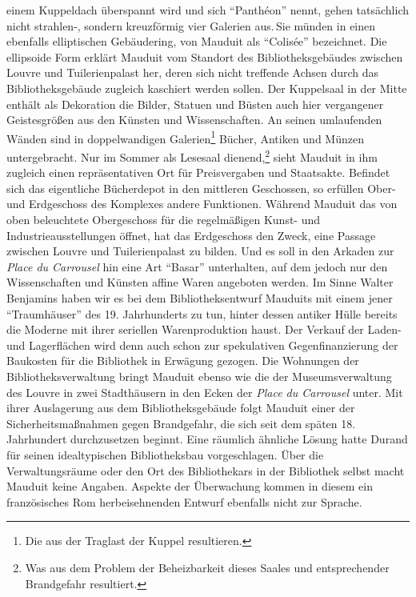 einem Kuppeldach überspannt wird und sich \enquote{Panthéon} nennt,
gehen tatsächlich nicht strahlen-, sondern kreuzförmig vier Galerien
aus.\,Sie münden in einen ebenfalls elliptischen Gebäudering, von Mauduit
als \enquote{Colisée} bezeichnet. Die ellipsoide Form erklärt Mauduit
vom Standort des Bibliotheksgebäudes zwischen Louvre und Tuilerienpalast
her, deren sich nicht treffende Achsen durch das Bibliotheksgebäude
zugleich kaschiert werden sollen. Der Kuppelsaal in der Mitte enthält
als Dekoration die Bilder, Statuen und Büsten auch hier vergangener
Geistesgrößen aus den Künsten und Wissenschaften. An seinen umlaufenden
Wänden sind in doppelwandigen Galerien\footnote{Die aus der Traglast der
  Kuppel resultieren.} Bücher, Antiken und Münzen untergebracht. Nur im
Sommer als Lesesaal dienend,\footnote{Was aus dem Problem der
  Beheizbarkeit dieses Saales und entsprechender Brandgefahr resultiert.}
sieht Mauduit in ihm zugleich einen repräsentativen Ort für
Preisvergaben und Staatsakte. Befindet sich das eigentliche Bücherdepot
in den mittleren Geschossen, so erfüllen Ober- und Erdgeschoss des
Komplexes andere Funktionen. Während Mauduit das von oben beleuchtete
Obergeschoss für die regelmäßigen Kunst- und Industrieausstellungen
öffnet, hat das Erdgeschoss den Zweck, eine Passage zwischen Louvre und
Tuilerienpalast zu bilden. Und es soll in den Arkaden zur \emph{Place du
Carrousel} hin eine Art \enquote{Basar} unterhalten, auf dem jedoch nur
den Wissenschaften und Künsten affine Waren angeboten werden. Im Sinne
Walter Benjamins haben wir es bei dem Bibliotheksentwurf Mauduits mit
einem jener \enquote{Traumhäuser} des 19. Jahrhunderts zu tun, hinter
dessen antiker Hülle bereits die Moderne mit ihrer seriellen
Warenproduktion haust. Der Verkauf der Laden- und Lagerflächen wird denn
auch schon zur spekulativen Gegenfinanzierung der Baukosten für die
Bibliothek in Erwägung gezogen. Die Wohnungen der Bibliotheksverwaltung
bringt Mauduit ebenso wie die der Museumsverwaltung des Louvre in zwei
Stadthäusern in den Ecken der \emph{Place du Carrousel} unter. Mit ihrer
Auslagerung aus dem Bibliotheksgebäude folgt Mauduit einer der
Sicherheitsmaßnahmen gegen Brandgefahr, die sich seit dem späten 18.
Jahrhundert durchzusetzen beginnt. Eine räumlich ähnliche Lösung hatte
Durand für seinen idealtypischen Bibliotheksbau vorgeschlagen. Über die
Verwaltungsräume oder den Ort des Bibliothekars in der Bibliothek selbst
macht Mauduit keine Angaben. Aspekte der Überwachung kommen in diesem
ein französisches Rom herbeisehnenden Entwurf ebenfalls nicht zur
Sprache.

